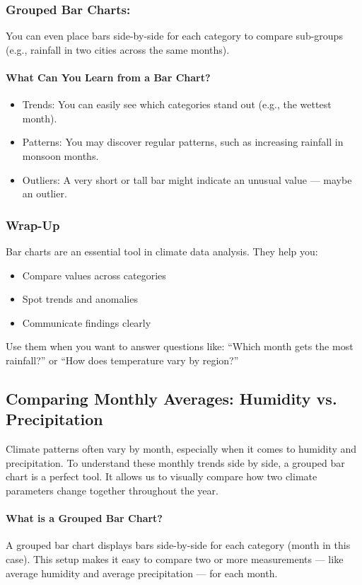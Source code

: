 \subsubsection*{Grouped Bar Charts:} You can even place bars side-by-side for each category to compare sub-groups (e.g., rainfall in two cities across the same months).

\paragraph{What Can You Learn from a Bar Chart?}
\begin{itemize}
  \item Trends: You can easily see which categories stand out (e.g., the wettest month).
  \item Patterns: You may discover regular patterns, such as increasing rainfall in monsoon months.
  \item Outliers: A very short or tall bar might indicate an unusual value — maybe an outlier.
\end{itemize}

\subsubsection*{Wrap-Up} 
 Bar charts are an essential tool in climate data analysis. They help you:
\begin{itemize}
  \item Compare values across categories
  \item Spot trends and anomalies
  \item Communicate findings clearly
\end{itemize}

Use them when you want to answer questions like: “Which month gets the most rainfall?” or “How does temperature vary by region?”

\subsection*{Comparing Monthly Averages: Humidity vs. Precipitation}

Climate patterns often vary by month, especially when it comes to humidity and precipitation. To understand these monthly trends side by side, a grouped bar chart is a perfect tool. It allows us to visually compare how two climate parameters change together throughout the year.

\paragraph{What is a Grouped Bar Chart?} A grouped bar chart displays bars side-by-side for each category (month in this case). This setup makes it easy to compare two or more measurements — like average humidity and average precipitation — for each month.

